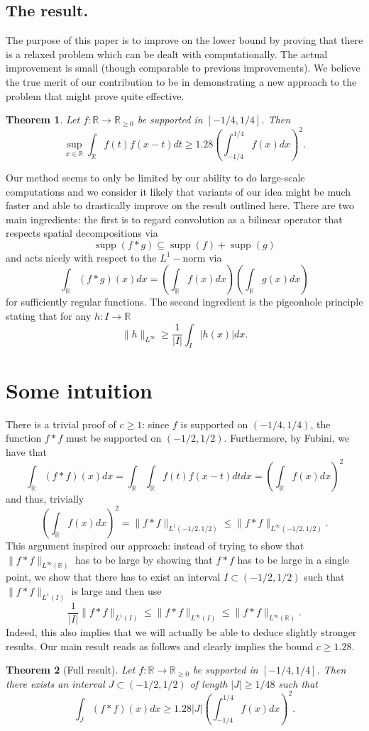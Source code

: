 \documentclass[10pt]{amsart}
\newtheorem*{thm}{Theorem}
\newcommand{\supp}{\operatorname{supp}}
\begin{document}
\subsection{The result.} The purpose of this paper is to improve on the lower bound by proving that there is a relaxed problem which can be dealt with computationally. 
The actual improvement is small (though comparable to previous improvements). We believe the true merit of our contribution to be in demonstrating a new approach to the problem that might prove
quite effective.

\begin{thm} Let $f:\mathbb{R} \rightarrow \mathbb{R}_{\geq 0}$ be supported in $[-1/4,1/4]$. Then
$$ \sup_{x \in \mathbb{R}}{\int_{\mathbb{R}}{f(t)f(x-t)dt}} \geq 1.28 \left(\int_{-1/4}^{1/4}{f(x)dx} \right)^2.$$
\end{thm}
Our method seems to only be limited by our ability to do large-scale computations and we consider it likely that variants of our idea might be
much faster and able to drastically improve on the result outlined here.
There are two main ingredients: the first is to regard convolution
as a bilinear operator that respects spatial decompositions via
$$ \supp(f*g) \subseteq \supp(f) + \supp(g)$$
and acts nicely with respect to the $L^1-$norm via
$$ \int_{\mathbb{R}}{(f*g)(x)dx} = \left( \int_{\mathbb{R}}{f(x)dx}\right) \left( \int_{\mathbb{R}}{g(x)dx}\right)$$
for sufficiently regular functions.
The second
ingredient is the pigeonhole principle stating that for any $h:I \rightarrow \mathbb{R}_{}$
$$ \|h\|_{L^{\infty}} \geq \frac{1}{|I|}\int_{I}{|h(x)| dx}.$$

\section{Some intuition} 
There is a trivial proof of $c \geq 1$: since $f$ is supported
on $(-1/4, 1/4)$, the function $f*f$ must be supported on $(-1/2, 1/2)$. Furthermore, by Fubini, we have that
$$\int_{\mathbb{R}}^{}{(f*f)(x)dx} = \int_{\mathbb{R}}{\int_{\mathbb{R}}^{}{f(t)f(x-t)dt}dx} =
\left(\int_{\mathbb{R}}^{}{f(x)dx}\right)^2$$
and thus, trivially
$$ \left(\int_{\mathbb{R}}^{}{f(x)dx}\right)^2 = \|f*f\|_{L^1(-1/2,1/2)} \leq \|f*f\|_{L^{\infty}(-1/2,1/2)}.$$
This argument inspired our approach: instead of trying to show that $\|f*f\|_{L^{\infty}(\mathbb{R})}$ has
to be large by showing that $f *f$ has to be large in a single point, we show that there has to exist an interval
$I \subset (-1/2, 1/2)$ such that $\|f*f\|_{L^1(I)}$ is large and then use
$$ \frac{1}{|I|}\|f*f\|_{L^1(I)} \leq \|f*f\|_{L^{\infty}(I)} \leq \|f*f\|_{L^{\infty}(\mathbb{R})}.$$
Indeed, this also implies that we will actually be able to deduce slightly stronger results. Our main
result reads as follows and clearly implies the bound $c \geq 1.28$.
\begin{thm}[Full result] Let $f:\mathbb{R} \rightarrow \mathbb{R}_{\geq 0}$ be supported in $[-1/4,1/4]$. Then there
exists an interval $J \subset (-1/2, 1/2)$ of length $|J| \geq 1/48$ such that
$$ \int_{J}{(f*f)(x)dx} \geq 1.28 |J|  \left(\int_{-1/4}^{1/4}{f(x)dx} \right)^2.$$
\end{thm}
\end{document}
